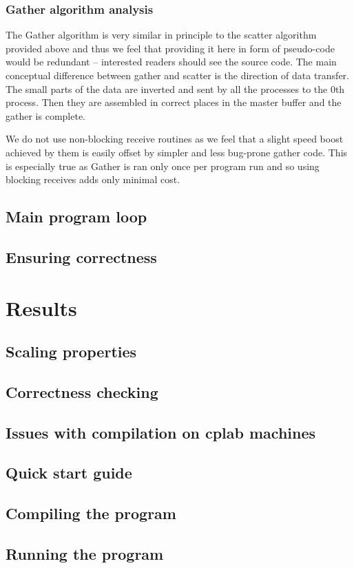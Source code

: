 \documentclass[11pt,a4paper]{article}
\begin{document}
\subsubsection{Gather algorithm analysis}
The Gather algorithm is very similar in principle to the scatter algorithm provided above and thus we feel that providing it here in form of pseudo-code would be redundant -- interested readers should see the source code. 
The main conceptual difference between gather and scatter is the direction of data transfer. 
The small parts of the data are inverted and sent by all the processes to the 0th process. 
Then they are assembled in correct places in the master buffer and the gather is complete.

We do not use non-blocking receive routines as we feel that a slight speed boost achieved by them is easily offset by simpler and less bug-prone gather code. 
This is especially true as Gather is ran only once per program run and so using blocking receives adds only minimal cost.
\subsection{Main program loop}
\subsection{Ensuring correctness}

\section{Results}
\subsection{Scaling properties}
\subsection{Correctness checking}
\subsection{Issues with compilation on cplab machines}


\newpage
\begin{appendices}
\section{Quick start guide}
\subsection{Compiling the program}
\subsection{Running the program}

\end{appendices}
\end{document}
